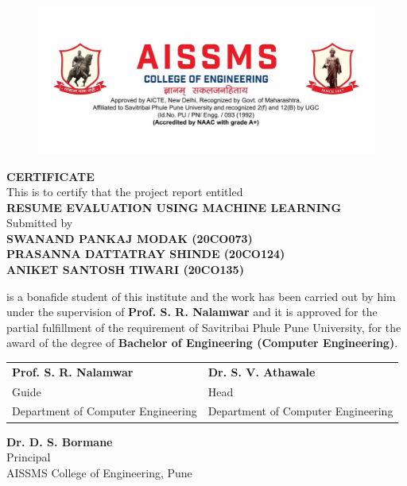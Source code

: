 \begin{figure}
    \centering
    \vspace*{-2cm}
    \includegraphics[width = 15cm]{./images/aissmslogo.jpeg}
\end{figure}

\begin{center}
    \vspace*{-2cm}
    \textbf{\LARGE CERTIFICATE} \\
    \vspace*{2.5em}
    This is to certify that the project report entitled \\
    \vspace*{1.0em}
    \textbf{\large RESUME EVALUATION USING MACHINE LEARNING} \\
    \vspace*{1.0em}
    Submitted by \\
    \vspace*{1.0em}
    \textbf{\normalsize SWANAND PANKAJ MODAK (20CO073) \\ PRASANNA DATTATRAY SHINDE (20CO124) \\ ANIKET SANTOSH TIWARI (20CO135)}
\end{center}
is a bonafide student of this institute and the work has been carried out by him under the supervision of \textbf{Prof. S. R. Nalamwar} and it is approved
for the partial fulfillment of the requirement of Savitribai Phule Pune University, for the award of the degree of
\textbf{Bachelor of Engineering (Computer Engineering)}.
\vspace*{2cm}
\begin{center}
    \begin{tabularx}{1.0\textwidth}{>{\centering\arraybackslash}X >{\centering\arraybackslash}X}  
        \textbf{Prof. S. R. Nalamwar} & \textbf{Dr. S. V. Athawale} \\ 
        Guide & Head \\ 
        Department of Computer Engineering & Department of Computer Engineering \\
    \end{tabularx}
\end{center}
\vspace*{2cm}
\begin{center}
    \textbf{Dr. D. S. Bormane} \\ 
    Principal \\
    AISSMS College of Engineering, Pune
\end{center}
